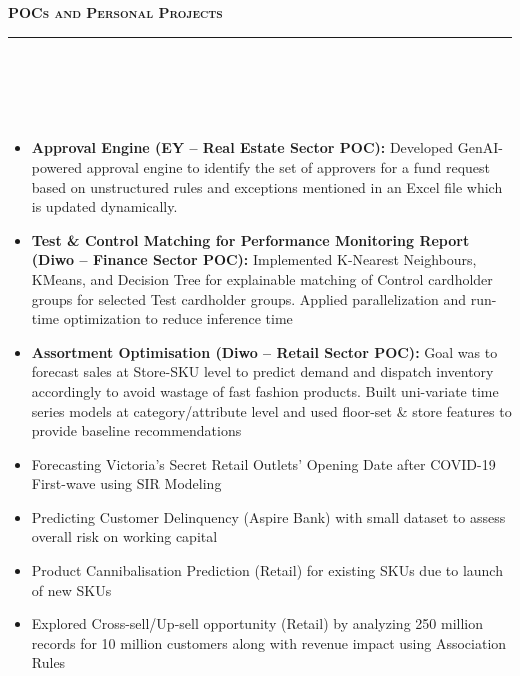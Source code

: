 \documentclass[a4paper,10pt]{article}
\newcommand{\lsep}{-0.5cm}
\newcommand{\resheading}[1]{{\small
        {
            \begin{minipage}
                {0.992\textwidth}\textbf{{\textsc{#1 \vphantom{p\^{E}} }}}
                \\[-0.3cm]
                \hrule
            \end{minipage}
            \\[-0.5cm]
        }
 }}
\begin{document}
\vspace{4pt}
\noindent
\resheading{\textbf{\large POCs and Personal Projects}}\\[\lsep]
\\[-0.3cm]
\begin{itemize}


\item \textbf{Approval Engine (EY -- Real Estate Sector POC): }{Developed GenAI-powered approval engine to identify the set of approvers for a fund request based on unstructured rules and exceptions mentioned in an Excel file which is updated dynamically.}
\\ [-0.5cm]

\item \textbf{Test \& Control Matching for Performance Monitoring Report (Diwo -- Finance Sector POC): }{Implemented K-Nearest Neighbours, KMeans, and Decision Tree for explainable matching of Control cardholder groups for selected Test cardholder groups. Applied parallelization and run-time optimization to reduce inference time}
\\ [-0.5cm]

\item \textbf{Assortment Optimisation (Diwo -- Retail Sector POC): }{Goal was to forecast sales at Store-SKU level to predict demand and dispatch inventory accordingly to avoid wastage of fast fashion products. Built uni-variate time series models at category/attribute level and used floor-set \& store features to provide baseline recommendations 
}
\\ [-0.5cm]

\item Forecasting Victoria's Secret Retail Outlets' Opening Date after COVID-19 First-wave using SIR Modeling
\\ [-0.5cm]

\item Predicting Customer Delinquency (Aspire Bank) with small dataset to assess overall risk on working capital
\\ [-0.5cm]

\item Product Cannibalisation Prediction (Retail) for existing SKUs due to launch of new SKUs
\\ [-0.5cm]

\item Explored Cross-sell/Up-sell opportunity (Retail) by analyzing 250 million records for 10 million customers along with revenue impact using Association Rules
\\ [-0.5cm]


\end{itemize}
\end{document}
